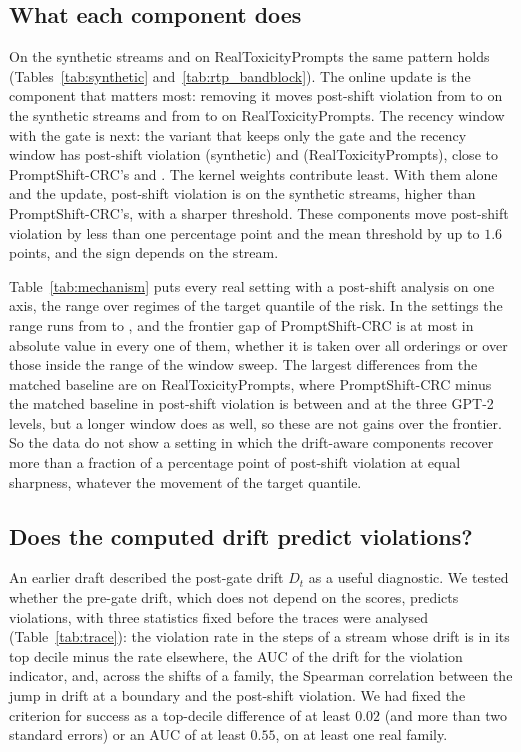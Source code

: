 \subsection{What each component does}\label{sec:res-ablation}

On the synthetic streams and on RealToxicityPrompts the same pattern holds (Tables~\ref{tab:synthetic} and~\ref{tab:rtp_bandblock}). The online update is the component that matters most: removing it moves post-shift violation from \synPSPost{} to \synNoUpdPost{} on the synthetic streams and from \RtpPSPost{} to \RtpNoUpdPost{} on RealToxicityPrompts. The recency window with the gate is next: the variant that keeps only the gate and the recency window has post-shift violation \synGateRecPost{} (synthetic) and \RtpGateRecPost{} (RealToxicityPrompts), close to PromptShift-CRC's \synPSPost{} and \RtpPSPost{}. The kernel weights contribute least. With them alone and the update, post-shift violation is \synKernelUpdPost{} on the synthetic streams, higher than PromptShift-CRC's, with a sharper threshold. These components move post-shift violation by less than one percentage point and the mean threshold by up to $1.6$ points, and the sign depends on the stream.

Table~\ref{tab:mechanism} puts every real setting with a post-shift analysis on one axis, the range over regimes of the target quantile of the risk. In the \MechRows{} settings the range runs from \MechSpreadMin{} to \MechSpreadMax{}, and the frontier gap of PromptShift-CRC is at most \MechGapMax{} in absolute value in every one of them, whether it is taken over all orderings or over those inside the range of the window sweep. The largest differences from the matched baseline are on RealToxicityPrompts, where PromptShift-CRC minus the matched baseline in post-shift violation is between \RtpAlphaHighPSvsMatchedPost{} and \RtpPSvsMatchedPost{} at the three GPT-2 levels, but a longer window does as well, so these are not gains over the frontier. So the data do not show a setting in which the drift-aware components recover more than a fraction of a percentage point of post-shift violation at equal sharpness, whatever the movement of the target quantile.

\subsection{Does the computed drift predict violations?}\label{sec:res-trace}

An earlier draft described the post-gate drift $D_t$ as a useful diagnostic. We tested whether the pre-gate drift, which does not depend on the scores, predicts violations, with three statistics fixed before the traces were analysed (Table~\ref{tab:trace}): the violation rate in the steps of a stream whose drift is in its top decile minus the rate elsewhere, the AUC of the drift for the violation indicator, and, across the shifts of a family, the Spearman correlation between the jump in drift at a boundary and the post-shift violation. We had fixed the criterion for success as a top-decile difference of at least $0.02$ (and more than two standard errors) or an AUC of at least $0.55$, on at least one real family.

